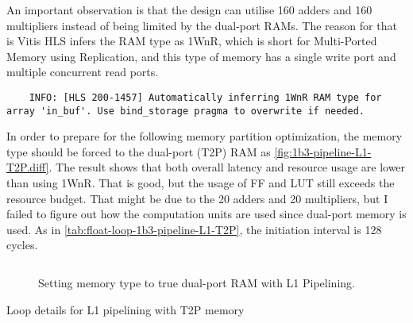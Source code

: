 An important observation is that the design can utilise 160 adders and 160 multipliers instead of being limited by the dual-port RAMs.
The reason for that is Vitis HLS infers the RAM type as 1WnR, which is short for Multi-Ported Memory using Replication, and this type of memory has a single write port and multiple concurrent read ports.
\begin{verbatim}
    INFO: [HLS 200-1457] Automatically inferring 1WnR RAM type for array 'in_buf'. Use bind_storage pragma to overwrite if needed.
\end{verbatim}

In order to prepare for the following memory partition optimization, the memory type should be forced to the dual-port (T2P) RAM as \autoref{fig:1b3-pipeline-L1-T2P.diff}.
The result shows that both overall latency and resource usage are lower than using 1WnR.
That is good, but the usage of FF and LUT still exceeds the resource budget.
That might be due to the 20 adders and 20 multipliers, but I failed to figure out how the computation units are used since dual-port memory is used.
As in \autoref{tab:float-loop-1b3-pipeline-L1-T2P}, the initiation interval is 128 cycles.

\begin{figure}[ht!]
    \centering
    \inputminted[firstline=3]{diff}{program/1b3-pipeline-L1-T2P.diff}
    \caption{Setting memory type to true dual-port RAM with L1 Pipelining.}\label{fig:1b3-pipeline-L1-T2P.diff}
\end{figure}

\begin{table}[ht!]
    \caption{Loop details for L1 pipelining with T2P memory}
    \label{tab:float-loop-1b3-pipeline-L1-T2P}
    \centering
    
\end{table}